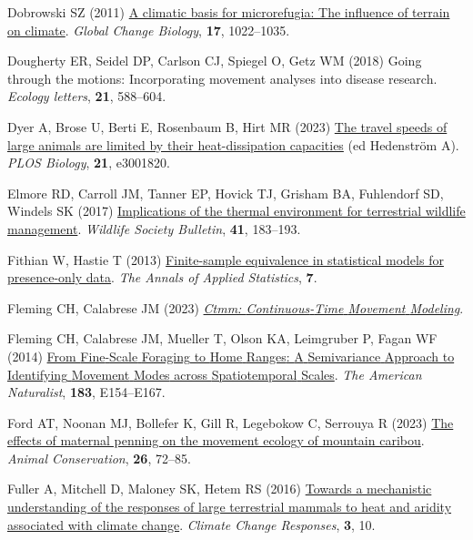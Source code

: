 \documentclass[
  12pt,
]{article}
\newlength{\cslhangindent}
\newenvironment{CSLReferences}[2] %
 {\begin{list}{}{%
  \setlength{\itemindent}{0pt}
  \setlength{\leftmargin}{0pt}
  \setlength{\parsep}{0pt}
  \ifodd #1
   \setlength{\leftmargin}{\cslhangindent}
   \setlength{\itemindent}{-1\cslhangindent}
  \fi
  \setlength{\itemsep}{#2\baselineskip}}}
 {\end{list}}
\begin{document}
\begin{CSLReferences}{1}{0}
Dobrowski SZ (2011) \href{https://doi.org/10.1111/j.1365-2486.2010.02263.x}{A climatic basis for microrefugia: The influence of terrain on climate}. \emph{Global Change Biology}, \textbf{17}, 1022--1035.

Dougherty ER, Seidel DP, Carlson CJ, Spiegel O, Getz WM (2018) Going through the motions: Incorporating movement analyses into disease research. \emph{Ecology letters}, \textbf{21}, 588--604.

Dyer A, Brose U, Berti E, Rosenbaum B, Hirt MR (2023) \href{https://doi.org/10.1371/journal.pbio.3001820}{The travel speeds of large animals are limited by their heat-dissipation capacities} (ed Hedenström A). \emph{PLOS Biology}, \textbf{21}, e3001820.

Elmore RD, Carroll JM, Tanner EP, Hovick TJ, Grisham BA, Fuhlendorf SD, Windels SK (2017) \href{https://doi.org/10.1002/wsb.772}{Implications of the thermal environment for terrestrial wildlife management}. \emph{Wildlife Society Bulletin}, \textbf{41}, 183--193.

Fithian W, Hastie T (2013) \href{https://doi.org/10.1214/13-AOAS667}{Finite-sample equivalence in statistical models for presence-only data}. \emph{The Annals of Applied Statistics}, \textbf{7}.

Fleming CH, Calabrese JM (2023) \emph{\emph{\href{https://CRAN.R-project.org/package=ctmm}{Ctmm: {Continuous}-{Time} {Movement} {Modeling}}}}.

Fleming CH, Calabrese JM, Mueller T, Olson KA, Leimgruber P, Fagan WF (2014) \href{https://doi.org/10.1086/675504}{From {Fine}-{Scale} {Foraging} to {Home} {Ranges}: {A} {Semivariance} {Approach} to {Identifying} {Movement} {Modes} across {Spatiotemporal} {Scales}}. \emph{The American Naturalist}, \textbf{183}, E154--E167.

Ford AT, Noonan MJ, Bollefer K, Gill R, Legebokow C, Serrouya R (2023) \href{https://doi.org/10.1111/acv.12801}{The effects of maternal penning on the movement ecology of mountain caribou}. \emph{Animal Conservation}, \textbf{26}, 72--85.

Fuller A, Mitchell D, Maloney SK, Hetem RS (2016) \href{https://doi.org/10.1186/s40665-016-0024-1}{Towards a mechanistic understanding of the responses of large terrestrial mammals to heat and aridity associated with climate change}. \emph{Climate Change Responses}, \textbf{3}, 10.


\end{CSLReferences}
\end{document}
